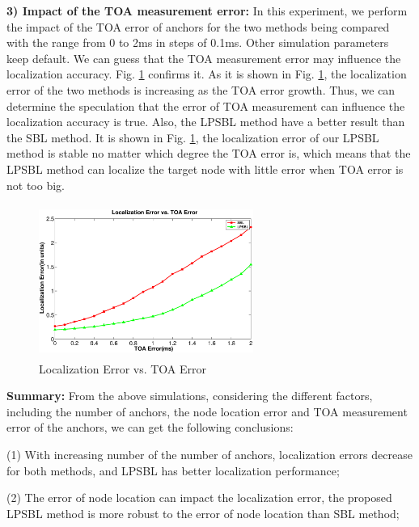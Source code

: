 \textbf{3) Impact of the TOA measurement error:}
In this experiment, we perform the impact of the TOA error of anchors for the two methods being compared with the range from 0 to 2ms in steps of 0.1ms. 
Other simulation parameters keep default. 
We can guess that the TOA measurement error may influence the localization accuracy. 
Fig. \ref{fig6} confirms it. As it is shown in Fig. \ref{fig6}, the localization error of the  two methods is increasing as the TOA error growth. 
Thus, we can determine the speculation that the error of TOA measurement can influence the localization accuracy is true. 
Also, the LPSBL method have a better result than the SBL method. 
It is shown in Fig. \ref{fig6}, the localization error of our LPSBL method is stable no matter which degree the TOA error is, which means that the LPSBL method can localize the target node with little error when TOA error is not too big.
  \begin{figure}[htb]       
			\vspace{-15mm}
            \includegraphics[height=5.0cm,width=7.0cm]{image/fig6.eps}
           \vspace{15mm}
            \caption{Localization Error vs. TOA Error}
             \vspace{-5mm}
             \label{fig6}
        \end{figure}
 \textbf{Summary:} From the above simulations, considering the different factors, including the number of anchors, the node location error and TOA measurement error of the anchors, we can get the following conclusions:

 (1) With increasing number of the number of anchors, localization errors decrease for both methods, and LPSBL has better localization performance;

 (2) The error of node location can impact the localization error, the proposed LPSBL method is more robust to the error of node location than SBL method;
 
